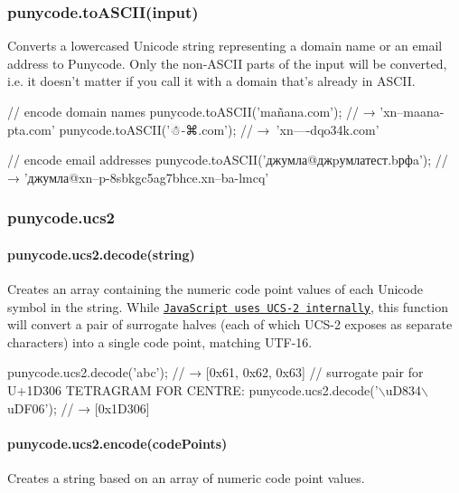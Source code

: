 \subsubsection*{{\ttfamily punycode.\+to\+A\+S\+C\+I\+I(input)}}

Converts a lowercased Unicode string representing a domain name or an email address to Punycode. Only the non-\/\+A\+S\+C\+II parts of the input will be converted, i.\+e. it doesn’t matter if you call it with a domain that’s already in A\+S\+C\+II.


\begin{DoxyCode}
// encode domain names
punycode.toASCII('mañana.com');
// → 'xn--maana-pta.com'
punycode.toASCII('☃-⌘.com');
// → 'xn----dqo34k.com'

// encode email addresses
punycode.toASCII('джумла@джpумлатест.bрфa');
// → 'джумла@xn--p-8sbkgc5ag7bhce.xn--ba-lmcq'
\end{DoxyCode}


\subsubsection*{{\ttfamily punycode.\+ucs2}}

\paragraph*{{\ttfamily punycode.\+ucs2.\+decode(string)}}

Creates an array containing the numeric code point values of each Unicode symbol in the string. While \href{https://mathiasbynens.be/notes/javascript-encoding}{\tt Java\+Script uses U\+C\+S-\/2 internally}, this function will convert a pair of surrogate halves (each of which U\+C\+S-\/2 exposes as separate characters) into a single code point, matching U\+T\+F-\/16.


\begin{DoxyCode}
punycode.ucs2.decode('abc');
// → [0x61, 0x62, 0x63]
// surrogate pair for U+1D306 TETRAGRAM FOR CENTRE:
punycode.ucs2.decode('\(\backslash\)uD834\(\backslash\)uDF06');
// → [0x1D306]
\end{DoxyCode}


\paragraph*{{\ttfamily punycode.\+ucs2.\+encode(code\+Points)}}

Creates a string based on an array of numeric code point values.


